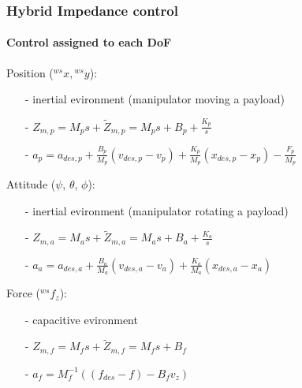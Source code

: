 \begin{frame}
  \frametitle{Hybrid Impedance control}
  \framesubtitle{Control assigned to each DoF}
  Position (${}^{ws}x,{}^{ws}y$):
  \begin{itemize}
  \item[-] inertial evironment (manipulator moving a payload)
  \item[-] $Z_{m,p} = M_p s + \tilde{Z}_{m,p} = M_p s + B_p + \frac{K_p}{s}$
  \item[-] $a_{p} = a_{des,p} + \frac{B_p}{M_p} (v_{des,p} - v_p) + \frac{K_p}{M_p} (x_{des,p} - x_p) - \frac{F_p}{M_p}$
  \end{itemize}
  Attitude ($\psi$, $\theta$, $\phi$):
  \begin{itemize}
  \item[-] inertial evironment (manipulator rotating a payload)
  \item[-] $Z_{m,a} = M_a s + \tilde{Z}_{m,a} = M_a s + B_a + \frac{K_a}{s}$
  \item[-] $a_a = a_{des,a} + \frac{B_a}{M_a} (v_{des,a} - v_a) + \frac{K_a}{M_a} (x_{des,a} - x_a)$
  \end{itemize}
  Force (${}^{ws}f_z$):
  \begin{itemize}
  \item[-] capacitive evironment
  \item[-] $Z_{m,f} = M_f s + \tilde{Z}_{m,f} = M_f s + B_f$
  \item[-] $a_{f} = M_f^{-1}((f_{des} - f) - B_f v_z)$
  \end{itemize}  
\end{frame}

